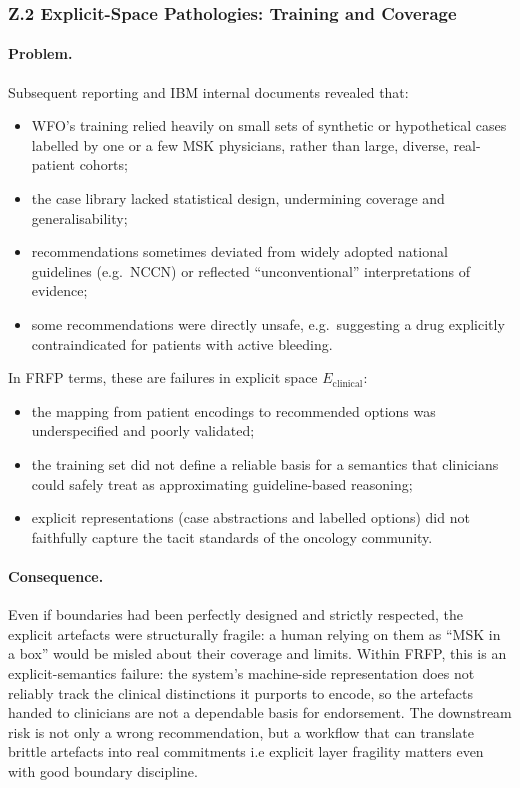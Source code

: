 \subsubsection*{Z.2 Explicit-Space Pathologies: Training and Coverage}

\paragraph{Problem.}
Subsequent reporting and IBM internal documents revealed that:

\begin{itemize}
  \item WFO’s training relied heavily on small sets of synthetic or
        hypothetical cases labelled by one or a few MSK physicians, rather
        than large, diverse, real-patient cohorts;
  \item the case library lacked statistical design, undermining coverage and
        generalisability;
  \item recommendations sometimes deviated from widely adopted national
        guidelines (e.g.\ NCCN) or reflected ``unconventional'' interpretations
        of evidence;
  \item some recommendations were directly unsafe, e.g.\ suggesting a drug
        explicitly contraindicated for patients with active bleeding.
\end{itemize}

In FRFP terms, these are failures in explicit space \(E_{\mathrm{clinical}}\):

\begin{itemize}
  \item the mapping from patient encodings to recommended options was
        underspecified and poorly validated;
  \item the training set did not define a reliable basis for a semantics
        that clinicians could safely treat as approximating guideline-based
        reasoning;
  \item explicit representations (case abstractions and labelled options)
        did not faithfully capture the tacit standards of the oncology
        community.
\end{itemize}

\paragraph{Consequence.}
Even if boundaries had been perfectly designed and strictly respected, the
explicit artefacts were structurally fragile:
a human relying on them as ``MSK in a box'' would be misled about their coverage and limits. Within FRFP, this is an explicit-semantics failure: the system’s
machine-side representation does not reliably track the clinical distinctions it purports to encode,
so the artefacts handed to clinicians are not a dependable basis for endorsement. The downstream
risk is not only a wrong recommendation, but a workflow that can translate brittle artefacts into
real commitments i.e explicit layer fragility matters even with good boundary discipline.

